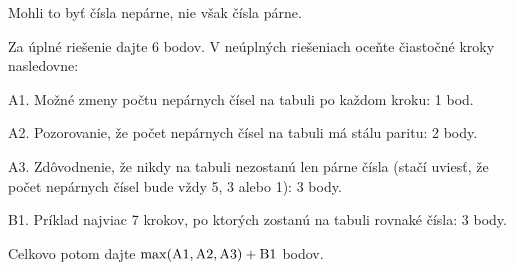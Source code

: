 {\zaver
Mohli to byť čísla nepárne, nie však čísla párne.

\schemaABC
Za úplné riešenie dajte 6 bodov. V neúplných
riešeniach oceňte čiastočné kroky nasledovne:
\item{A1.} Možné zmeny počtu nepárnych čísel na tabuli po každom kroku: 1 bod.
\item{A2.} Pozorovanie, že počet nepárnych čísel na tabuli má stálu paritu: 2 body.
\item{A3.} Zdôvodnenie, že nikdy na tabuli nezostanú len párne čísla (stačí uviesť, že počet nepárnych čísel bude vždy 5, 3 alebo 1): 3 body.
\item{B1.} Príklad najviac 7 krokov, po ktorých zostanú na tabuli rovnaké čísla: 3 body.

\noindent
Celkovo potom dajte $\rm\max(A1,A2,A3)+B1$ bodov.
\endschema
}

